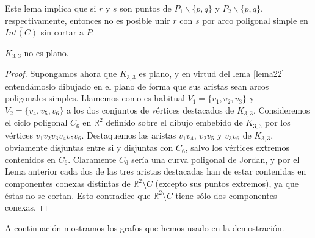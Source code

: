 	Este lema implica que si $r$ y $s$ son puntos de $P_1 \backslash \{ p,q \}$ y $P_2 \backslash \{ p,q \}$, respectivamente, entonces no es posible unir $r$ con $s$  por arco poligonal simple en $\overline{Int(C)}$ sin cortar a $P$.

\begin{theorem}\label{lema25}
	$K_{3,3}$ no es plano.
\end{theorem}
\begin{proof}
Supongamos ahora que $K_{3,3}$ es  plano, y en virtud del lema \ref{lema22} entendámoslo dibujado en el plano de forma que sus aristas sean arcos poligonales simples. Llamemos como es habitual $V_1=\{v_1,v_2,v_3\}$ y $V_2=\{v_4,v_5,v_6\}$ a los dos conjuntos de vértices destacados de $K_{3,3}$.
Consideremos el ciclo poligonal $C_6$ en $\mathbb{R}^2$ definido sobre el dibujo embebido de  $K_{3,3}$  por los vértices $v_{1}v_{2}v_{3}v_{4}v_{5}v_{6}$. Destaquemos las aristas $v_{1}v_{4}$, $v_{2}v_{5}$ y $v_{3}v_{6}$ de $K_{3,3}$, obviamente disjuntas entre si y disjuntas con $C_6$,  salvo los vértices extremos contenidos en $C_6$. Claramente $C_6$ sería una curva poligonal de Jordan, y por el Lema anterior cada dos de las tres aristas destacadas han de estar contenidas en componentes conexas distintas de $\mathbb{R}^2\setminus C$ (excepto sus puntos extremos), ya que éstas no se cortan.  Esto contradice que $\mathbb{R}^2\setminus C$ tiene sólo dos componentes conexas.
\end{proof}

A continuación mostramos  los grafos que hemos usado en la demostración.


